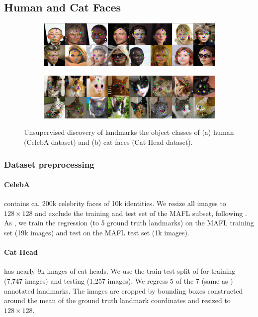 	\subsection{Human and Cat Faces}\label{sec:kp_faces}
		\begin{figure}[htp]
			\centering
			\begin{subfigure}{1.\textwidth}
			\includegraphics[trim={0cm 0cm 0cm 0cm},clip, width=1.\linewidth]{fig/shape/0celeba}\caption{}
			\end{subfigure}
			\begin{subfigure}{1.\textwidth}
			\includegraphics[trim={0cm 0cm 0cm 0cm},clip, width=1.\linewidth]{fig/shape/0cats}\caption{}
			\end{subfigure}
			\caption{{Unsupervised discovery of landmarks the object classes of (a) human (CelebA dataset) and (b) cat faces (Cat Head dataset).}}
			\label{fig:kp_faces}
		\end{figure}

		\subsubsection{Dataset preprocessing}
			\paragraph{CelebA} \cite{liu15facewild} contains ca. 200k celebrity faces of 10k identities.
			We resize all images to $128\times 128$ and exclude the training and test set of the MAFL subset, following \cite{thewlis17}.
			As  \cite{thewlis17, zhang18}, we train the regression (to 5 ground truth landmarks) on the MAFL training set (19k images) and test on the MAFL test set (1k images).

			\paragraph{Cat Head} \cite{zhang08cathead}  has nearly 9k images of cat heads.
			We use the train-test split of \cite{zhang18} for training (7,747 images) and testing (1,257 images).
			We regress 5 of the 7 (same as \cite{zhang18}) annotated landmarks.
			The images are cropped by bounding boxes constructed around the mean of the ground truth landmark coordinates and resized to $128\times128$.

